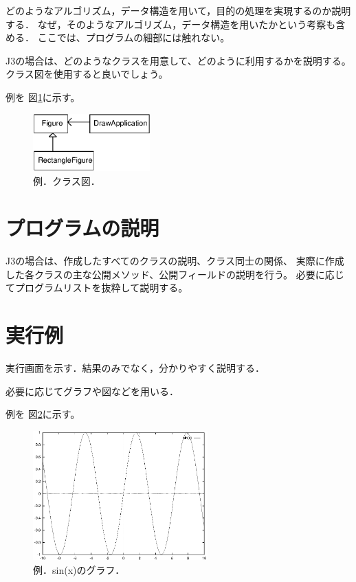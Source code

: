\documentclass[11pt,a4j]{jarticle}
\begin{document}
どのようなアルゴリズム，データ構造を用いて，目的の処理を実現するのか説明する．
なぜ，そのようなアルゴリズム，データ構造を用いたかという考察も含める．
ここでは、プログラムの細部には触れない。

J3の場合は、どのようなクラスを用意して、どのように利用するかを説明する。
クラス図を使用すると良いでしょう。

例を 図\ref{fig:class}に示す。

\begin{figure}[htbp]
  \begin{center}
    \leavevmode
    \includegraphics[width=0.4\textwidth]{class_samp.eps}
    \caption{例．クラス図．}
    \label{fig:class}
  \end{center}
\end{figure}

\section{プログラムの説明}
J3の場合は、作成したすべてのクラスの説明、クラス同士の関係、
実際に作成した各クラスの主な公開メソッド、公開フィールドの説明を行う。
必要に応じてプログラムリストを抜粋して説明する。

\section{実行例}
実行画面を示す．結果のみでなく，分かりやすく説明する．

必要に応じてグラフや図などを用いる．

例を 図\ref{fig:graph}に示す。

\begin{figure}[htbp]
  \begin{center}
    \leavevmode
    \includegraphics[width=0.6\textwidth]{graph.eps} 
    \caption{例．sin(x)のグラフ．}
    \label{fig:graph}
  \end{center}
\end{figure}
\end{document}
